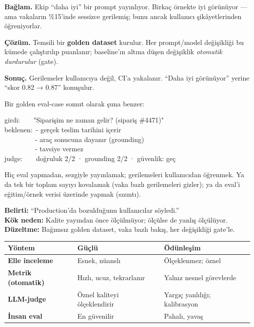 \begin{prodbox}
\textbf{Bağlam.} Ekip ``daha iyi'' bir prompt yayınlıyor. Birkaç örnekte iyi
görünüyor --- ama vakaların \%15'inde sessizce gerilemiş; bunu ancak kullanıcı
şikâyetlerinden öğreniyorlar.

\smallskip
\textbf{Çözüm.} Temsili bir \textbf{golden dataset} kurulur. Her prompt/model
değişikliği bu kümede çalıştırılıp puanlanır; baseline'ın altına düşen değişiklik
\emph{otomatik durdurulur} (gate).

\smallskip
\textbf{Sonuç.} Gerilemeler kullanıcıya değil, CI'a yakalanır. ``Daha iyi
görünüyor'' yerine ``skor 0.82 → 0.87'' konuşulur.
\end{prodbox}

\vspace{2pt}
Bir golden eval-case somut olarak şuna benzer:
\begin{artifact}
girdi:\ \ \ \ "Siparişim ne zaman gelir? (sipariş \#4471)"\\
beklenen:\ - gerçek teslim tarihini içerir\\
\ \ \ \ \ \ \ \ \ - araç sonucuna dayanır (grounding)\\
\ \ \ \ \ \ \ \ \ - tavsiye vermez\\
judge:\ \ \ \ doğruluk 2/2 · grounding 2/2 · güvenlik: geç
\end{artifact}

\begin{antibox}
Hiç eval yapmadan, sezgiyle yayınlamak; gerilemeleri kullanıcıdan öğrenmek. Ya
da tek bir toplam sayıyı kovalamak (vaka bazlı gerilemeleri gizler); ya da eval'i
eğitim/örnek verisi üzerinde yapmak (sızıntı).

\smallskip
\textbf{Belirti:} ``Production'da bozulduğunu kullanıcılar söyledi.''\\
\textbf{Kök neden:} Kalite yayından önce ölçülmüyor; ölçülse de yanlış ölçülüyor.\\
\textbf{Düzeltme:} Bağımsız golden dataset, vaka bazlı bakış, her değişikliği gate'le.
\end{antibox}

\vspace{2pt}
\begin{tabularx}{\linewidth}{@{}>{\raggedright\arraybackslash}p{28mm} L L@{}}
\toprule
{\sffamily\bfseries\small Yöntem} & {\sffamily\bfseries\small Güçlü} & {\sffamily\bfseries\small Ödünleşim} \\
\midrule
\textbf{Elle inceleme} & Esnek, nüanslı & Ölçeklenmez; öznel \\
\addlinespace[2pt]
\textbf{Metrik (otomatik)} & Hızlı, ucuz, tekrarlanır & Yalnız nesnel görevlerde \\
\addlinespace[2pt]
\textbf{LLM-judge} & Öznel kaliteyi ölçeklendirir & Yargıç yanlılığı; kalibrasyon \\
\addlinespace[2pt]
\textbf{İnsan eval} & En güvenilir & Pahalı, yavaş \\
\bottomrule
\end{tabularx}

